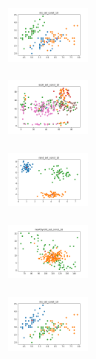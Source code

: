 \begin{figure}[H]
\begin{subfigure}
    \end{subfigure}
    \hfill
    \begin{subfigure}
        \centering
        \includegraphics[width=0.234\textwidth]{img/am01mej/iris_set_const_10_589741062_clust.png}
    \end{subfigure}
    \hfill
    \begin{subfigure}
        \centering
        \includegraphics[width=0.234\textwidth]{img/am01mej/ecoli_set_const_10_589741062_clust.png}
    \end{subfigure}
    \hfill
    \begin{subfigure}
        \centering
        \includegraphics[width=0.234\textwidth]{img/am01mej/rand_set_const_10_589741062_clust.png}
    \end{subfigure}
    \hfill
    \begin{subfigure}
        \centering
        \includegraphics[width=0.234\textwidth]{img/am01mej/newthyroid_set_const_10_589741062_clust.png}
    \end{subfigure}
    \hfill
    \begin{subfigure}
        \centering
        \includegraphics[width=0.234\textwidth]{img/am01mej/iris_set_const_10_277451237_clust.png}
    \end{subfigure}

\end{figure}
